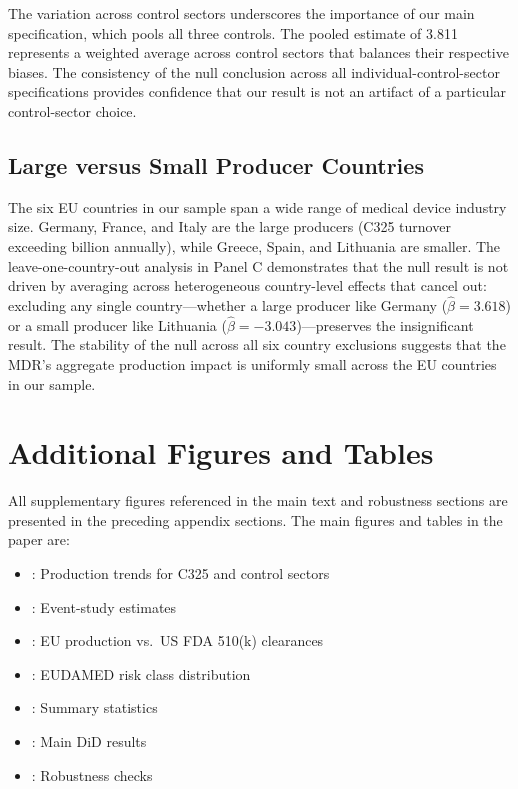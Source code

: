 \documentclass[12pt]{article}
\begin{document}
The variation across control sectors underscores the importance of our main specification, which pools all three controls. The pooled estimate of 3.811 represents a weighted average across control sectors that balances their respective biases. The consistency of the null conclusion across all individual-control-sector specifications provides confidence that our result is not an artifact of a particular control-sector choice.

\subsection{Large versus Small Producer Countries}

The six EU countries in our sample span a wide range of medical device industry size. Germany, France, and Italy are the large producers (C325 turnover exceeding  billion annually), while Greece, Spain, and Lithuania are smaller. The leave-one-country-out analysis in  Panel C demonstrates that the null result is not driven by averaging across heterogeneous country-level effects that cancel out: excluding any single country---whether a large producer like Germany ($\hat{\beta} = 3.618$) or a small producer like Lithuania ($\hat{\beta} = -3.043$)---preserves the insignificant result. The stability of the null across all six country exclusions suggests that the MDR's aggregate production impact is uniformly small across the EU countries in our sample.



\section{Additional Figures and Tables}
\label{app:additional}

All supplementary figures referenced in the main text and robustness sections are presented in the preceding appendix sections. The main figures and tables in the paper are:

\begin{itemize}
\item {}: Production trends for C325 and control sectors
\item {}: Event-study estimates
\item {}: EU production vs.\ US FDA 510(k) clearances
\item {}: EUDAMED risk class distribution
\item {}: Summary statistics
\item {}: Main DiD results
\item {}: Robustness checks
\end{itemize}
\end{document}
